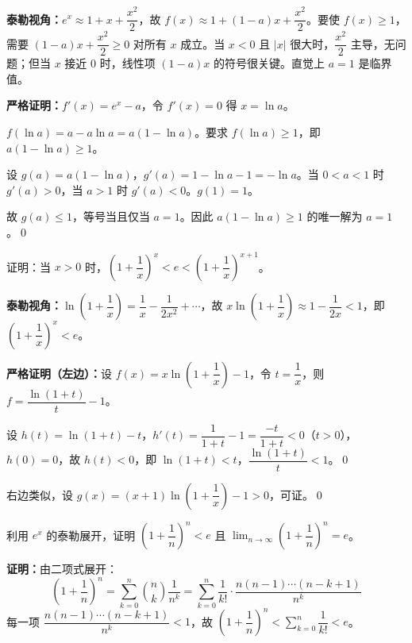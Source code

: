 \documentclass[12pt, a4paper]{ctexart}
\begin{document}
\textbf{泰勒视角：}$e^x \approx 1 + x + \dfrac{x^2}{2}$，故 $f(x) \approx 1 + (1-a)x + \dfrac{x^2}{2}$。要使 $f(x) \geq 1$，需要 $(1-a)x + \dfrac{x^2}{2} \geq 0$ 对所有 $x$ 成立。当 $x < 0$ 且 $|x|$ 很大时，$\dfrac{x^2}{2}$ 主导，无问题；但当 $x$ 接近 $0$ 时，线性项 $(1-a)x$ 的符号很关键。直觉上 $a = 1$ 是临界值。

\textbf{严格证明：}$f'(x) = e^x - a$，令 $f'(x) = 0$ 得 $x = \ln a$。

$f(\ln a) = a - a\ln a = a(1 - \ln a)$。要求 $f(\ln a) \geq 1$，即 $a(1 - \ln a) \geq 1$。

设 $g(a) = a(1 - \ln a)$，$g'(a) = 1 - \ln a - 1 = -\ln a$。当 $0 < a < 1$ 时 $g'(a) > 0$，当 $a > 1$ 时 $g'(a) < 0$。$g(1) = 1$。

故 $g(a) \leq 1$，等号当且仅当 $a = 1$。因此 $a(1 - \ln a) \geq 1$ 的唯一解为 $a = 1$。\qed

\begin{examplebox}[【例题11】放缩证明综合提高]
证明：当 $x > 0$ 时，$\left(1 + \dfrac{1}{x}\right)^x < e < \left(1 + \dfrac{1}{x}\right)^{x+1}$。
\end{examplebox}

\textbf{泰勒视角：}$\ln\left(1 + \dfrac{1}{x}\right) = \dfrac{1}{x} - \dfrac{1}{2x^2} + \cdots$，故 $x \ln\left(1 + \dfrac{1}{x}\right) \approx 1 - \dfrac{1}{2x} < 1$，即 $\left(1 + \dfrac{1}{x}\right)^x < e$。

\textbf{严格证明（左边）：}设 $f(x) = x\ln\left(1 + \dfrac{1}{x}\right) - 1$，令 $t = \dfrac{1}{x}$，则 $f = \dfrac{\ln(1+t)}{t} - 1$。

设 $h(t) = \ln(1+t) - t$，$h'(t) = \dfrac{1}{1+t} - 1 = \dfrac{-t}{1+t} < 0$（$t > 0$），$h(0) = 0$，故 $h(t) < 0$，即 $\ln(1+t) < t$，$\dfrac{\ln(1+t)}{t} < 1$。\qed

右边类似，设 $g(x) = (x+1)\ln\left(1 + \dfrac{1}{x}\right) - 1 > 0$，可证。\qed

\begin{examplebox}[【例题12】泰勒展开与数列极限]
利用 $e^x$ 的泰勒展开，证明 $\left(1 + \dfrac{1}{n}\right)^n < e$ 且 $\lim_{n \to \infty}\left(1 + \dfrac{1}{n}\right)^n = e$。
\end{examplebox}

\textbf{证明：}由二项式展开：
\[
\left(1 + \frac{1}{n}\right)^n = \sum_{k=0}^{n} \binom{n}{k} \frac{1}{n^k} = \sum_{k=0}^{n} \frac{1}{k!} \cdot \frac{n(n-1)\cdots(n-k+1)}{n^k}
\]
每一项 $\dfrac{n(n-1)\cdots(n-k+1)}{n^k} < 1$，故 $\left(1 + \dfrac{1}{n}\right)^n < \displaystyle\sum_{k=0}^{n} \dfrac{1}{k!} < e$。
\end{document}

